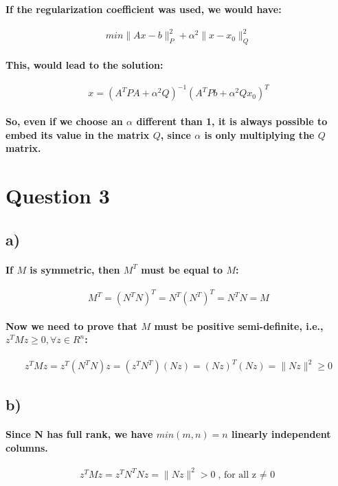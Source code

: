\documentclass[a4paper]{article}    %
\begin{document}
\paragraph{If the regularization coefficient was used, we would have:}
    \[min\|Ax-b\|_{P}^{2}+\alpha^2\|x-x_{0}\|_{Q}^{2}\]

\paragraph{This, would lead to the solution:}
\[x = (A^TPA + \alpha^2Q)^{-1}(A^TPb + \alpha^2Qx_0)^T\]

\paragraph{So, even if we choose an $\alpha$ different than 1, it is always possible to embed its value in the matrix $Q$, since $\alpha$ is only multiplying the $Q$ matrix.}

\newpage

\section*{Question 3}

\subsection*{a)}

\paragraph{If $M$ is symmetric, then $M^T$ must be equal to $M$:}
    \[M^T = (N^TN)^T = N^T(N^T)^T = N^TN = M\]
\paragraph{Now we need to prove that $M$ must be positive semi-definite, i.e., $z^TMz \geq 0, \forall z \in R^n$:}
    \[z^TMz = z^T(N^TN)z = (z^TN^T)(Nz) = (Nz)^T(Nz) = \|Nz\|^2 \geq 0\]

\subsection*{b)}

\paragraph{Since N has full rank, we have $min(m,n) = n$ linearly independent columns.}
\[z^TMz = z^TN^TNz = \|Nz\|^2 > 0 \text{, for all z $\neq$ 0}\]
\end{document}
